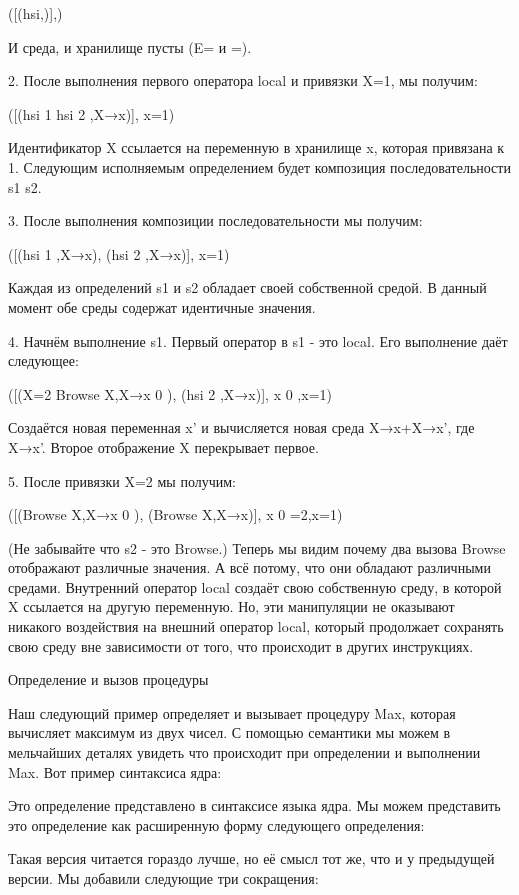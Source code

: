 ([(hsi,)],)

И среда, и хранилище пусты (E= и =).

2. После выполнения первого оператора local и привязки X=1, мы получим:

([(hsi
1
hsi
2
,{X→x})],
{x=1})

Идентификатор X ссылается на переменную в хранилище x, которая привязана к 1. Следующим исполняемым определением будет композиция последовательности s1 s2.

3. После выполнения композиции последовательности мы получим:

([(hsi
1
,{X→x}), (hsi
2
,{X→x})],
{x=1})

Каждая из определений s1 и s2 обладает своей собственной средой. В данный момент обе среды содержат идентичные значения.

4. Начнём выполнение s1. Первый оператор в s1 - это local. Его выполнение даёт следующее:

([(X=2 {Browse X},{X→x
0
}), (hsi
2
,{X→x})],
{x
0
,x=1})

Создаётся новая переменная x' и вычисляется новая среда {X→x}+{X→x'}, где {X→x'}. Второе отображение X перекрывает первое.

5. После привязки X=2 мы получим:

([({Browse X},{X→x
0
}), ({Browse X},{X→x})],
{x
0
=2,x=1})

(Не забывайте что s2 - это Browse.) Теперь мы видим почему два вызова Browse отображают различные значения. А всё потому, что они обладают различными средами. Внутренний оператор local создаёт свою собственную среду, в которой X ссылается на другую переменную. Но, эти манипуляции не оказывают никакого воздействия на внешний оператор local, который продолжает сохранять свою среду вне зависимости от того, что происходит в других инструкциях.

Определение и вызов процедуры

Наш следующий пример определяет и вызывает процедуру Max, которая вычисляет максимум из двух чисел. С помощью семантики мы можем в мельчайших деталях увидеть что происходит при определении и выполнении Max. Вот пример синтаксиса ядра:

Это определение представлено в синтаксисе языка ядра. Мы можем представить это определение как расширенную форму следующего определения:

Такая версия читается гораздо лучше, но её смысл тот же, что и у предыдущей версии. Мы добавили следующие три сокращения:

